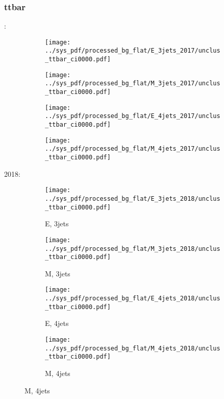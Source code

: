 \documentclass{beamer}
\begin{document}
\begin{frame}
\frametitle{ttbar}
\fontsize{5}{1}:
\begin{figure}
\centering
\begin{subfigure}[b]{0.24\textwidth}
\texttt{[image: ../sys\_pdf/processed\_bg\_flat/E\_3jets\_2017/unclus\_ttbar\_ci0000.pdf]}
\end{subfigure}
\begin{subfigure}[b]{0.24\textwidth}
\texttt{[image: ../sys\_pdf/processed\_bg\_flat/M\_3jets\_2017/unclus\_ttbar\_ci0000.pdf]}
\end{subfigure}
\begin{subfigure}[b]{0.24\textwidth}
\texttt{[image: ../sys\_pdf/processed\_bg\_flat/E\_4jets\_2017/unclus\_ttbar\_ci0000.pdf]}
\end{subfigure}
\begin{subfigure}[b]{0.24\textwidth}
\texttt{[image: ../sys\_pdf/processed\_bg\_flat/M\_4jets\_2017/unclus\_ttbar\_ci0000.pdf]}
\end{subfigure}
\end{figure}
2018:
\begin{figure}
\centering
\begin{subfigure}[b]{0.24\textwidth}
\texttt{[image: ../sys\_pdf/processed\_bg\_flat/E\_3jets\_2018/unclus\_ttbar\_ci0000.pdf]}
\captionsetup{font=tiny}
\caption{E, 3jets}
\end{subfigure}
\begin{subfigure}[b]{0.24\textwidth}
\texttt{[image: ../sys\_pdf/processed\_bg\_flat/M\_3jets\_2018/unclus\_ttbar\_ci0000.pdf]}
\captionsetup{font=tiny}
\caption{M, 3jets}
\end{subfigure}
\begin{subfigure}[b]{0.24\textwidth}
\texttt{[image: ../sys\_pdf/processed\_bg\_flat/E\_4jets\_2018/unclus\_ttbar\_ci0000.pdf]}
\captionsetup{font=tiny}
\caption{E, 4jets}
\end{subfigure}
\begin{subfigure}[b]{0.24\textwidth}
\texttt{[image: ../sys\_pdf/processed\_bg\_flat/M\_4jets\_2018/unclus\_ttbar\_ci0000.pdf]}
\captionsetup{font=tiny}
\caption{M, 4jets}
\end{subfigure}
\end{figure}
\end{frame}
\end{document}
